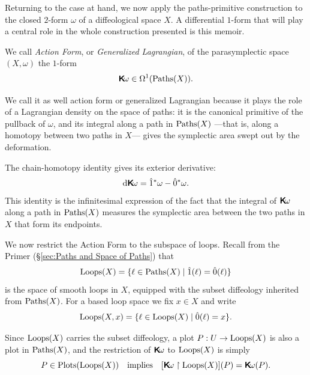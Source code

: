 \documentclass[10pt,reqno,letterpaper,twoside]{amsbook}
\begin{document}
  \begin{article}
    \label{art:action-form}
    Returning to the case at hand,
    we now apply the paths-primitive construction to the closed $2$-form $\omega$ of a diffeological space $X$.
    A differential $1$-form that will play a central role in the whole construction presented is this memoir.
    
    \begin{definition}
      We call \emph{Action Form},
      or \emph{Generalized Lagrangian},
      of the parasymplectic space $(X,\omega)$ the $1$-form
      \[
        \boldsymbol{\mathsf{K}}\!\omega \in \Omega^1(\operatorname{Paths}(X)).
        \]%
    \end{definition}
    
    We call it as well action form or generalized Lagrangian because it plays the role of a Lagrangian density on the space of paths:
    it is the canonical primitive of the pullback of $\omega$,
    and its integral along a path in $\operatorname{Paths}(X)$
    ---that is, along a homotopy between two paths in $X$---
    gives the symplectic area swept out by the deformation.
    
    The chain-homotopy identity gives its exterior derivative:
    \[
      \mathrm{d}\boldsymbol{\mathsf{K}}\!\omega = \hat 1^*\omega - \hat 0^*\omega.
      \]%
    This identity is the infinitesimal expression of the fact
    that the integral of $\boldsymbol{\mathsf{K}}\!\omega$ along a path in $\operatorname{Paths}(X)$
    measures the symplectic area between the two paths in $X$
    that form its endpoints.
    
    We now restrict the Action Form to the subspace of loops.
    Recall from the Primer (\S\ref{sec:Paths and Space of Paths}) that
    \[
      \operatorname{Loops}(X) = \{ \ell \in \operatorname{Paths}(X) \mid \hat 1(\ell) = \hat 0(\ell) \}
      \]%
    is the space of smooth loops in $X$,
    equipped with the subset diffeology inherited from $\operatorname{Paths}(X)$.
    For a based loop space we fix $x \in X$ and write
    \[
      \operatorname{Loops}(X,x) = \{ \ell \in \operatorname{Loops}(X) \mid \hat 0(\ell) = x \}.
      \]%
    
    Since $\operatorname{Loops}(X)$ carries the subset diffeology,
    a plot $P: U \to \operatorname{Loops}(X)$ is also a plot in $\operatorname{Paths}(X)$,
    and the restriction of $\boldsymbol{\mathsf{K}}\!\omega$ to $\operatorname{Loops}(X)$ is simply
    \[
      P \in \mathrm{Plots}(\operatorname{Loops}(X)) \quad\text{implies}\quad [\boldsymbol{\mathsf{K}}\!\omega \restriction \operatorname{Loops}(X)](P) = \boldsymbol{\mathsf{K}}\!\omega(P).
      \]%
    

\end{article}
\end{document}
